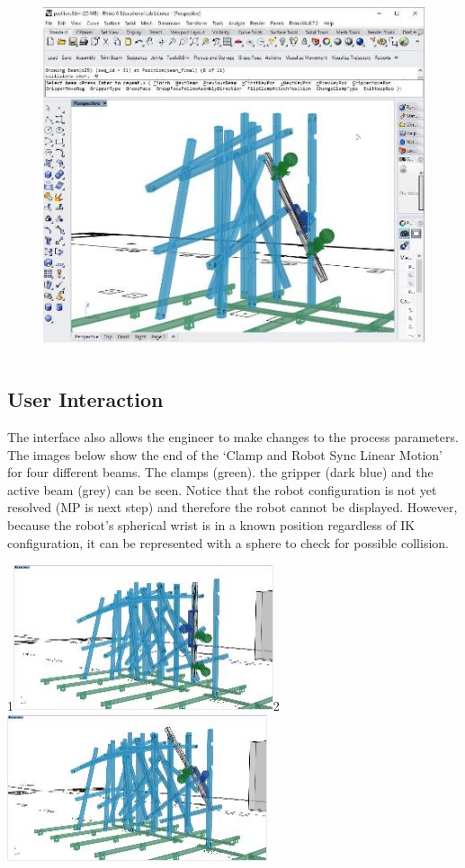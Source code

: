 \documentclass[11pt]{book}
\begin{document}
\begin{figure}[H]
\includegraphics[width=12.14cm,height=10.67cm]{./images/image41.jpeg}
\end{figure}


\subsection{User Interaction}

The interface also allows the engineer to make changes to the process parameters. The images below show the end of the ‘Clamp and Robot Sync Linear Motion’ for four different beams. The clamps (green). the gripper (dark blue) and the active beam (grey) can be seen. Notice that the robot configuration is not yet resolved (MP is next step) and therefore the robot cannot be displayed. However, because the robot’s spherical wrist is in a known position regardless of IK configuration, it can be represented with a sphere to check for possible collision.

{\small 1\includegraphics[width=7.64cm,height=4.3cm]{./images/image42.jpeg}2\includegraphics[width=7.64cm,height=4.32cm]{./images/image43.jpeg}}
\end{document}
